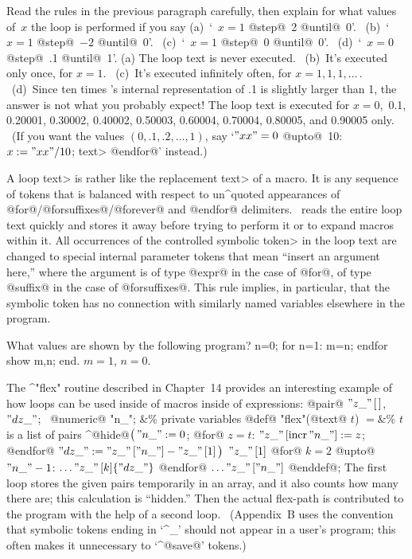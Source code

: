 \dangerexercise Read the rules in the previous paragraph carefully, then
explain for what values of~$x$ the loop is performed if you say
(a)~`\thinspace@for@~$x=1$ @step@~2 @until@~0\thinspace'. \
(b)~`\thinspace@for@~$x=1$ @step@~$-2$ @until@~0\thinspace'. \
(c)~`\thinspace@for@~$x=1$ @step@~0 @until@~0\thinspace'. \
(d)~`\thinspace@for@~$x=0$ @step@~.1 @until@~1\thinspace'.
\answer (a) The loop text is never executed. \
(b)~It's executed only once, for $x=1$. \
(c)~It's executed infinitely often, for $x=1,1,1,\ldots\,$. \
(d)~Since ten times \MF's internal representation of
.1 is slightly larger than 1, the answer
is not what you probably expect! The loop text is executed for
$x=0$,~0.1, 0.20001, 0.30002, 0.40002, 0.50003, 0.60004, 0.70004, 0.80005,
and 0.90005 only. \ (If you want the values $(0,.1,.2,\ldots,1)$, say
`\thinspace@for@ $"xx"=0$ @upto@~10: $x:="xx"/10$; \<text> @endfor@' instead.)

\danger A \<loop text> is rather like the \<replacement text> of a macro.
It is any sequence of tokens that is balanced with respect to
un^{quote}d appearances of @for@/@forsuffixes@/@forever@ and @endfor@
delimiters. \MF\ reads the entire loop text quickly and stores it away
before trying to perform it or to expand macros within it. All occurrences
of the controlled \<symbolic token> in the loop text are changed to
special internal parameter tokens that mean ``insert an argument here,''
where the argument is of type @expr@ in the case of @for@, of
type @suffix@ in the case of @forsuffixes@. This rule implies, in
particular, that the symbolic token has no connection with similarly
named variables elsewhere in the program.

\dangerexercise What values are shown by the following program?
\begintt
n=0; for n=1: m=n; endfor show m,n; end.
\endtt
\answer $m=1$, $n=0$.

\danger The ^"flex" routine described in Chapter~14 provides an interesting
example of how loops can be used inside of macros inside of expressions:
\begindisplay
@pair@ $"z\_"\,[\,]$, $"dz\_"$; \ @numeric@ "n\_"\thinspace;
 &\% private variables\cr
@def@ "flex"(@text@ $t$) $=$&\% $t$ is a list of pairs\cr
\quad^@hide@$\bigl(\,"n\_":=0$;\cr
\qquad @for@ $z=t$: $"z\_"\,[{\rm incr}\,"n\_"]:=z$; @endfor@\cr
\qquad $"dz\_":="z\_"\,["n\_"]-"z\_"\,[1]\,\bigr)$\cr
\quad $"z\_"\,[1]$ @for@ $k=2$ @upto@ $"n\_"-1$:
 $\ldots"z\_"\,[k]\{"dz\_"\}$ @endfor@\hidewidth\cr
\qquad $\ldots"z\_"\,["n\_"]$ @enddef@;\cr
\enddisplay
The first loop stores the given pairs temporarily in an array, and it also
counts how many there are; this calculation is ``hidden.'' Then
the actual flex-path is contributed to the program with the help of
a second loop. \ (Appendix~B uses the convention that symbolic tokens
ending in `^{\_}' should not appear in a user's program; this often
makes it unnecessary to `^@save@' tokens.)

